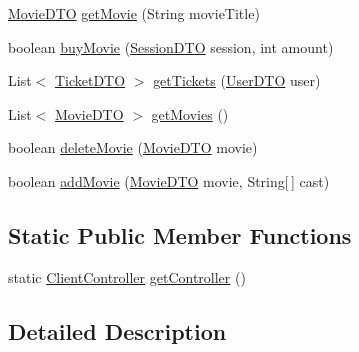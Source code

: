 \begin{DoxyCompactItemize}
\item 
\mbox{\hyperlink{classes_1_1deusto_1_1server_1_1data_1_1_movie_d_t_o}{Movie\+D\+TO}} \mbox{\hyperlink{classes_1_1deusto_1_1client_1_1controller_1_1_client_controller_ae371135958d6f88011239d360d936ada}{get\+Movie}} (String movie\+Title)
\item 
boolean \mbox{\hyperlink{classes_1_1deusto_1_1client_1_1controller_1_1_client_controller_a92f0a66750a4f02c11de68814bc0d96f}{buy\+Movie}} (\mbox{\hyperlink{classes_1_1deusto_1_1server_1_1data_1_1_session_d_t_o}{Session\+D\+TO}} session, int amount)
\item 
List$<$ \mbox{\hyperlink{classes_1_1deusto_1_1server_1_1data_1_1_ticket_d_t_o}{Ticket\+D\+TO}} $>$ \mbox{\hyperlink{classes_1_1deusto_1_1client_1_1controller_1_1_client_controller_a672fc1afb95f03c33cd659345fe1ca71}{get\+Tickets}} (\mbox{\hyperlink{classes_1_1deusto_1_1server_1_1data_1_1_user_d_t_o}{User\+D\+TO}} user)
\item 
List$<$ \mbox{\hyperlink{classes_1_1deusto_1_1server_1_1data_1_1_movie_d_t_o}{Movie\+D\+TO}} $>$ \mbox{\hyperlink{classes_1_1deusto_1_1client_1_1controller_1_1_client_controller_ad69e183cc953af14b9d526c635eecb61}{get\+Movies}} ()
\item 
boolean \mbox{\hyperlink{classes_1_1deusto_1_1client_1_1controller_1_1_client_controller_acf2fc3025cb669a68fc0de5b1e3ee243}{delete\+Movie}} (\mbox{\hyperlink{classes_1_1deusto_1_1server_1_1data_1_1_movie_d_t_o}{Movie\+D\+TO}} movie)
\item 
boolean \mbox{\hyperlink{classes_1_1deusto_1_1client_1_1controller_1_1_client_controller_a095a09ed143856ea25f51749de71f279}{add\+Movie}} (\mbox{\hyperlink{classes_1_1deusto_1_1server_1_1data_1_1_movie_d_t_o}{Movie\+D\+TO}} movie, String\mbox{[}$\,$\mbox{]} cast)
\end{DoxyCompactItemize}
\subsection*{Static Public Member Functions}
\begin{DoxyCompactItemize}
\item 
static \mbox{\hyperlink{classes_1_1deusto_1_1client_1_1controller_1_1_client_controller}{Client\+Controller}} \mbox{\hyperlink{classes_1_1deusto_1_1client_1_1controller_1_1_client_controller_aa76786bb097da98592adb6aeefa8d996}{get\+Controller}} ()
\end{DoxyCompactItemize}


\subsection{Detailed Description}


